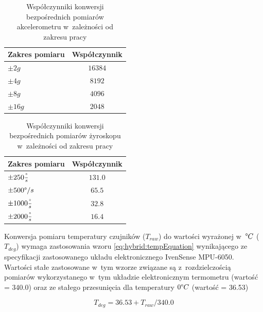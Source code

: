 

\begin{table}[!htp]
	\centering
	\caption{Współczynniki konwersji bezpośrednich pomiarów akcelerometru w~zależności od zakresu pracy}
	\label{tab:hybrid:accRangeFactors} 
	\begin{tabular}{|l|c|}
		\hline
		Zakres pomiaru              & Współczynnik \\ \hline
		$\pm2g$                     & $16384$        \\ \hline
		\rowcolor{black!20} $\pm4g$ & $8192$         \\ \hline
		$\pm8g$                     & $4096$         \\ \hline
		$\pm16g$                    & $2048$         \\ \hline
	\end{tabular}
\end{table}
\begin{table}[!htp]
	\centering
	\caption{Współczynniki konwersji bezpośrednich pomiarów żyroskopu w~zależności od zakresu pracy}	
	\label{tab:hybrid:gyroRangeFactors}	
	\begin{tabular}{|l|c|}
		\hline
		Zakres pomiaru                        & Współczynnik \\ \hline
		$\pm250\frac{\degree}{s}$             & $131.0$        \\ \hline
		\rowcolor{black!20} $\pm500\degree/s$ & $65.5$         \\ \hline
		$\pm1000\frac{\degree}{s}$            & $32.8$         \\ \hline
		$\pm2000\frac{\degree}{s}$            & $16.4$         \\ \hline
	\end{tabular}
\end{table} 		
 

Konwersja pomiaru temperatury czujników ($T_{raw}$) do wartości wyrażonej w~$\degree C$ ($T_{deg}$) wymaga zastosowania wzoru \ref{eq:hybrid:tempEquation} wynikającego ze specyfikacji zastosowanego układu elektronicznego IvenSense MPU-6050. Wartości stałe zastosowane w~tym wzorze związane są z~rozdzielczością pomiarów wykorzystanego w~tym układzie elektronicznym termometru (wartość = 340.0) oraz ze stałego przesunięcia dla temperatury $0 \degree C$ (wartość = 36.53)

\begin{equation}
	T_{deg} = 36.53 + T_{raw} / 340.0
	\label{eq:hybrid:tempEquation}
\end{equation}

